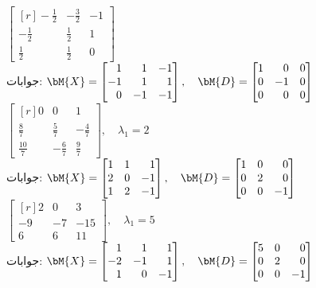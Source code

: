\quad
$\begin{bmatrix*}[r] -\tfrac{1}{2}&-\tfrac{3}{2}&-1\\[0.25em] -\tfrac{1}{2}&\tfrac{1}{2}&1\\[0.25em] \tfrac{1}{2}&\tfrac{1}{2}&0 \end{bmatrix*}$\\
جوابات:
$\bM{X}=\begin{bmatrix*}[r] 1&1&-1\\-1&1&1\\0&-1&-1 \end{bmatrix*},\quad \bM{D}=\begin{bmatrix*}[r] 1&0&0\\0&-1&0\\0&0&0 \end{bmatrix*}$
\quad
$\begin{bmatrix*}[r] 0&0&1\\[0.25em] \tfrac{8}{7}&\tfrac{5}{7}&-\tfrac{4}{7}\\[0.25em] \tfrac{10}{7}&-\tfrac{6}{7}&\tfrac{9}{7} \end{bmatrix*},\quad \lambda_1=2$\\
جوابات:
$\bM{X}=\begin{bmatrix*}[r] 1&1&1\\2&0&-1\\1&2&-1 \end{bmatrix*},\quad \bM{D}=\begin{bmatrix*}[r] 1&0&0\\0&2&0\\0&0&-1 \end{bmatrix*}$
\quad
$\begin{bmatrix*}[r] 2&0&3\\ -9&-7&-15\\ 6&6&11 \end{bmatrix*},\quad \lambda_1=5$\\
جوابات:
$\bM{X}=\begin{bmatrix*}[r] 1&1&1\\-2&-1&1\\1&0&-1 \end{bmatrix*},\quad \bM{D}=\begin{bmatrix*}[r] 5&0&0\\0&2&0\\0&0&-1 \end{bmatrix*}$
\quad
